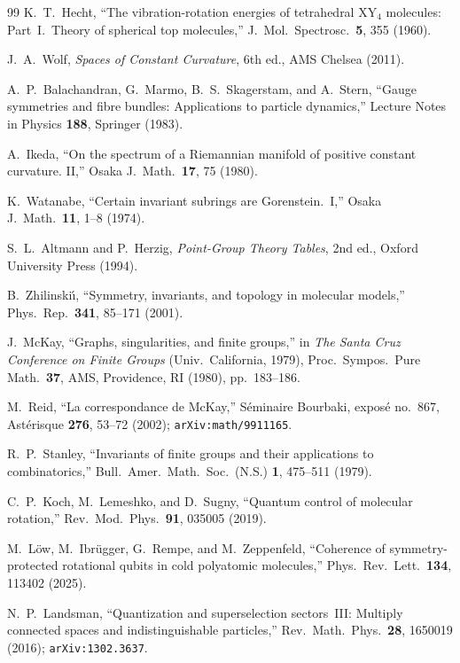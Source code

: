 \documentclass[12pt]{article}
\theoremstyle{definition}
\theoremstyle{remark}
\begin{document}
\begin{thebibliography}{99}
  K.~T.~Hecht,
  ``The vibration-rotation energies of tetrahedral
  XY$_4$ molecules: Part~I.\ Theory of spherical
  top molecules,''
  J.\ Mol.\ Spectrosc.\ \textbf{5}, 355 (1960).

  J.~A.~Wolf,
  \emph{Spaces of Constant Curvature},
  6th ed., AMS Chelsea (2011).

  A.~P.~Balachandran, G.~Marmo, B.~S.~Skagerstam,
  and A.~Stern,
  ``Gauge symmetries and fibre bundles:
  Applications to particle dynamics,''
  Lecture Notes in Physics \textbf{188},
  Springer (1983).

  A.~Ikeda,
  ``On the spectrum of a Riemannian manifold of positive
  constant curvature. II,''
  Osaka J.\ Math.\ \textbf{17}, 75 (1980).

  K.~Watanabe,
  ``Certain invariant subrings are Gorenstein.\ I,''
  Osaka J.\ Math.\ \textbf{11}, 1--8 (1974).

  S.~L.~Altmann and P.~Herzig,
  \emph{Point-Group Theory Tables},
  2nd ed., Oxford University Press (1994).

  B.~Zhilinski\'{\i},
  ``Symmetry, invariants, and topology in molecular
  models,''
  Phys.\ Rep.\ \textbf{341}, 85--171 (2001).

  J.~McKay,
  ``Graphs, singularities, and finite groups,''
  in \emph{The Santa Cruz Conference on Finite Groups}
  (Univ.\ California, 1979),
  Proc.\ Sympos.\ Pure Math.\ \textbf{37},
  AMS, Providence, RI (1980), pp.~183--186.

  M.~Reid,
  ``La correspondance de McKay,''
  S\'eminaire Bourbaki, expos\'e no.~867,
  Ast\'erisque \textbf{276}, 53--72 (2002);
  \texttt{arXiv:math/9911165}.

  R.~P.~Stanley,
  ``Invariants of finite groups and their
  applications to combinatorics,''
  Bull.\ Amer.\ Math.\ Soc.\ (N.S.)
  \textbf{1}, 475--511 (1979).

  C.~P.~Koch, M.~Lemeshko, and D.~Sugny,
  ``Quantum control of molecular rotation,''
  Rev.\ Mod.\ Phys.\ \textbf{91}, 035005 (2019).

  M.~L\"ow, M.~Ibr\"ugger, G.~Rempe, and M.~Zeppenfeld,
  ``Coherence of symmetry-protected rotational qubits
  in cold polyatomic molecules,''
  Phys.\ Rev.\ Lett.\ \textbf{134}, 113402 (2025).

  N.~P.~Landsman,
  ``Quantization and superselection sectors~III:
  Multiply connected spaces and indistinguishable
  particles,''
  Rev.\ Math.\ Phys.\ \textbf{28}, 1650019 (2016);
  \texttt{arXiv:1302.3637}.

\end{thebibliography}
\end{document}
